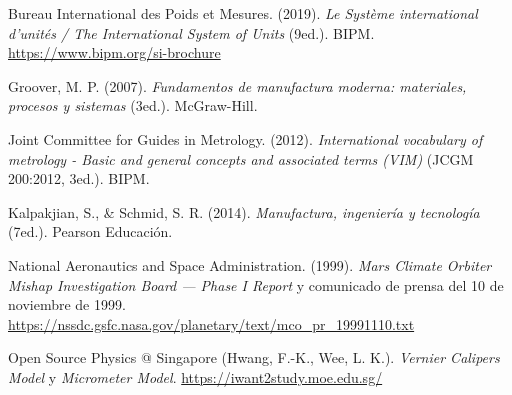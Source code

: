 \documentclass[12pt,a4paper]{article}
\begin{document}
\begin{enumerate}[label={[\arabic*]},ref=\arabic*,leftmargin=2.2em,itemsep=5pt]
	\item Bureau International des Poids et Mesures. (2019). \emph{Le
		      Système international d'unités / The International System of Units}
	      (9\textdegree ed.). BIPM. \url{https://www.bipm.org/si-brochure}
	\item Groover, M. P. (2007). \emph{Fundamentos de manufactura moderna:
		      materiales, procesos y sistemas} (3\textdegree ed.). McGraw-Hill.
	\item Joint Committee for Guides in Metrology. (2012).
	      \emph{International vocabulary of metrology - Basic and general concepts
		      and associated terms (VIM)} (JCGM 200:2012, 3\textdegree ed.). BIPM.
	\item Kalpakjian, S., \& Schmid, S. R. (2014). \emph{Manufactura, ingeniería y
		      tecnología} (7\textdegree ed.). Pearson Educación.
	\item National Aeronautics and Space Administration. (1999). \emph{Mars
		      Climate Orbiter Mishap Investigation Board — Phase I Report} y
	      comunicado de prensa del 10 de noviembre de 1999.
	      \url{https://nssdc.gsfc.nasa.gov/planetary/text/mco_pr_19991110.txt}
	\item Open Source Physics @ Singapore (Hwang, F.-K., Wee, L. K.).
	      \emph{Vernier Calipers Model} y \emph{Micrometer Model}.
	      \url{https://iwant2study.moe.edu.sg/}
\end{enumerate}
\end{document}
